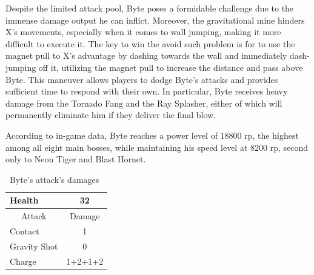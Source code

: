 Despite the limited attack pool, Byte poses a formidable challenge due to the immense damage output he can inflict. Moreover, the gravitational mine hinders X's movements, especially when it comes to wall jumping, making it more difficult to execute it. The key to win the avoid such problem is for to use the magnet pull to X's advantage by dashing towards the wall and immediately dash-jumping off it, utilizing the magnet pull to increase the distance and pass above Byte. This maneuver allows players to dodge Byte's attacks and provides sufficient time to respond with their own. In particular, Byte receives heavy damage from the Tornado Fang and the Ray Splasher, either of which will permanently eliminate him if they deliver the final blow.

According to in-game data, Byte reaches a power level of 18800 rp, the highest among all eight main bosses, while maintaining his speed level at 8200 rp, second only to Neon Tiger and Blast Hornet.

\begin{table}[htp]
	\centering
	\begin{tabular}[h]{l c}
		\toprule
		Health  & 32\\
		\midrule
		\multicolumn{1}{c}{Attack} & \multicolumn{1}{c}{Damage}\\
		Contact & 1\\
		Gravity Shot& 0\\
		Charge& 1+2+1+2\\
		\bottomrule
	\end{tabular}
	\caption{Byte's attack's damages~\cite{wiki:Byte,book:Compendium}}
\end{table} 

